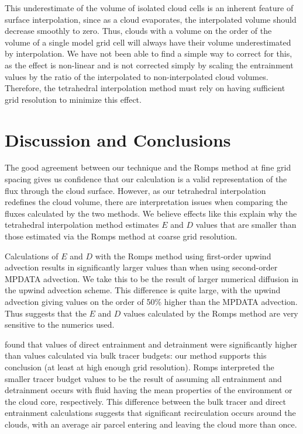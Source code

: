 \documentclass[12pt]{article}
\begin{document}
This underestimate of the volume of isolated cloud cells is an inherent 
feature of surface interpolation, since as a cloud evaporates, the 
interpolated volume should decrease smoothly to zero.  Thus, clouds with a 
volume on the order of the volume of a single model grid cell will always have 
their volume underestimated by interpolation.  We have not been able to find a 
simple way to correct for this, as the effect is non-linear and is not 
corrected simply by scaling the entrainment values by the ratio of the 
interpolated to non-interpolated cloud volumes.  Therefore, the tetrahedral 
interpolation method must rely on having sufficient grid resolution to minimize 
this effect.


\section{Discussion and Conclusions}

The good agreement between our technique and the Romps method at fine grid 
spacing gives us confidence that our calculation is a valid representation of 
the flux through the cloud surface.  However, as our tetrahedral interpolation 
redefines the cloud volume, there are interpretation issues when comparing the 
fluxes calculated by the two methods.  We believe effects like this explain why 
the tetrahedral interpolation method estimates $E$ and $D$ values that are 
smaller than those estimated via the Romps method at coarse grid resolution.

Calculations of $E$ and $D$ with the Romps method using first-order upwind 
advection results in significantly larger values than when using 
second-order MPDATA advection.  We take this to be the result of larger 
numerical diffusion in the upwind advection scheme.  This difference is quite 
large, with the upwind advection giving values on the order of 50\% higher than 
the MPDATA advection.  Thus suggests that the $E$ and $D$ values calculated by 
the Romps method are very sensitive to the numerics used. 

\citet{Romps2010} found that values of direct entrainment and detrainment were 
significantly higher than values calculated via bulk tracer budgets: our 
method supports this conclusion (at least at high enough grid resolution).  
Romps interpreted the smaller tracer budget values to be the result of assuming
all entrainment and detrainment occurs with fluid having the mean properties of
the environment or the cloud core, respectively.  This difference between the 
bulk tracer and direct entrainment calculations suggests that significant 
recirculation occurs around the clouds, with an average air parcel entering 
and leaving the cloud more than once.  
\end{document}
